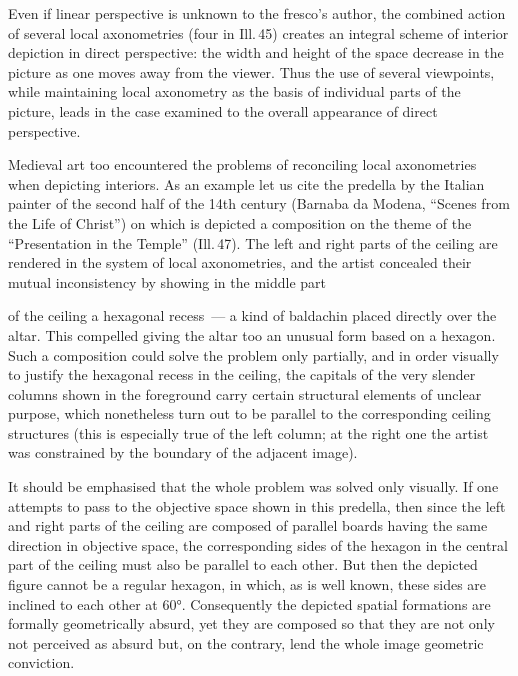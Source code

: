 


Even if linear perspective is unknown to the fresco's author, the combined action of
several local axonometries (four in Ill.\,45) creates an integral scheme of interior
depiction in direct perspective: the width and height of the space decrease in the
picture as one moves away from the viewer.  Thus the use of several viewpoints, while
maintaining local axonometry as the basis of individual parts of the picture, leads
in the case examined to the overall appearance of direct perspective.

Medieval art too encountered the problems of reconciling local axonometries when
depicting interiors.  As an example let us cite the predella by the Italian painter
of the second half of the 14th century (Barnaba da Modena, ``Scenes from the Life of
Christ'') on which is depicted a composition on the theme of the ``Presentation in
the Temple'' (Ill.\,47).  The left and right parts of the ceiling are rendered in the
system of local axonometries, and the artist concealed their mutual inconsistency by
showing in the middle part


of the ceiling a hexagonal recess~--- a kind of baldachin placed directly over the
altar.  This compelled giving the altar too an unusual form based on a hexagon.  Such
a composition could solve the problem only partially, and in order visually to justify
the hexagonal recess in the ceiling, the capitals of the very slender columns shown
in the foreground carry certain structural elements of unclear purpose, which
nonetheless turn out to be parallel to the corresponding ceiling structures (this is
especially true of the left column; at the right one the artist was constrained by
the boundary of the adjacent image).

It should be emphasised that the whole problem was solved only visually.  If one
attempts to pass to the objective space shown in this predella, then since the left
and right parts of the ceiling are composed of parallel boards having the same
direction in objective space, the corresponding sides of the hexagon in the central
part of the ceiling must also be parallel to each other.  But then the depicted
figure cannot be a regular hexagon, in which, as is well known, these sides are
inclined to each other at 60°.  Consequently the depicted spatial formations are
formally geometrically absurd, yet they are composed so that they are not only not
perceived as absurd but, on the contrary, lend the whole image geometric conviction.


